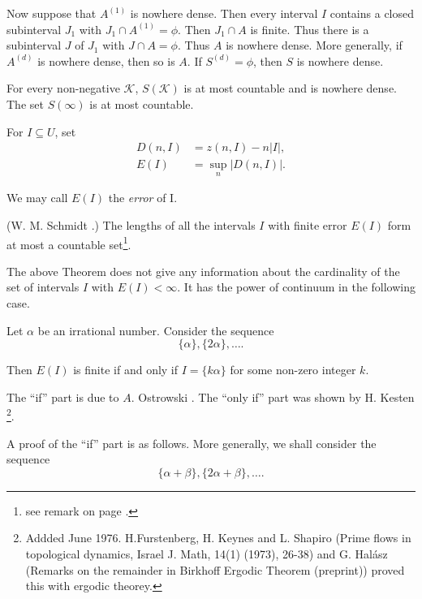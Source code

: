 Now suppose that $A^{(1)}$ is nowhere dense. Then every interval $I$ contains a closed subinterval $J_{1}$ with $J_{1} \cap A^{(1)} = \phi$. Then $J_{1} \cap A$ is finite. Thus there is a subinterval $J$ of $J_{1}$ with $J \cap A = \phi$. Thus $A$ is nowhere dense. More generally, if $A^{(d)}$ is nowhere dense, then so is $A$. If $S^{(d)} = \phi$, then $S$ is nowhere dense.

\begin{coro*}
  For every non-negative $\mathcal{K}$, $S(\mathcal{K})$ is at most countable  and is nowhere dense. The set $S(\infty)$ is at most countable.
\end{coro*}

For $I \subseteq U$, set
\begin{align*}
  D(n, I) & = z(n, I) - n|I|,\\
  E(I) & = \sup_{n} |D(n, I)|.
\end{align*}\pageoriginale

We may call $E(I)$ the {\em error} of I.

\begin{theorem}[$^*$]\label{chap1:sec7:thm7C}
(W. M. Schmidt \cite{26}.) The lengths of all the intervals $I$ with finite error $E(I)$ form at most a countable set\footnote{see remark on page \pageref{55}.}.
\end{theorem}

The above Theorem does not give any information about the cardinality of the set of intervals $I$ with $E(I) < \infty$. It has the power of continuum in the following case.

\begin{theorem}[$^*$]\label{chap1:sec7:thm7D}
Let $\alpha$ be an irrational number. Consider the sequence
$$
\{\alpha\}, \{2\alpha\}, \ldots .
$$
\end{theorem}

Then $E(I)$ is finite if and only if $I = \{k\alpha\}$ for some non-zero integer $k$. 

The ``if'' part is due to $A$. Ostrowski \cite{17}. The ``only if'' part was shown by H. Kesten \cite{11}\footnote{Addded June 1976. H.Furstenberg, H. Keynes and L. Shapiro (Prime flows in topological dynamics, Israel J. Math, 14(1) (1973), 26-38) and G. Hal\'{a}sz (Remarks on the remainder in Birkhoff Ergodic Theorem (preprint)) proved this with ergodic theorey.}.

A proof of the ``if'' part is as follows. More generally, we shall consider the sequence
$$
\{\alpha + \beta\}, \{2\alpha + \beta\}, \ldots .
$$

